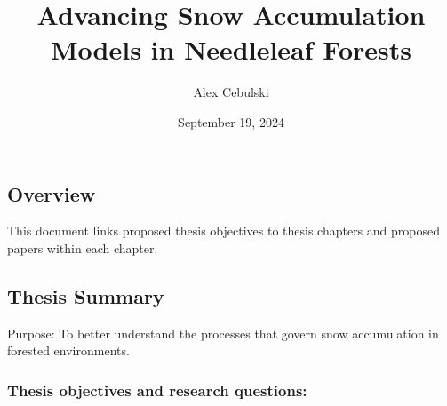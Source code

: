 \documentclass[
  letterpaper,
  DIV=11,
  numbers=noendperiod]{scrartcl}
\title{Advancing Snow Accumulation Models in Needleleaf Forests}
\author{Alex Cebulski}
\date{September 19, 2024}
\begin{document}
\maketitle

\subsection{Overview}\label{overview}

This document links proposed thesis objectives to thesis chapters and
proposed papers within each chapter.

\subsection{Thesis Summary}\label{thesis-summary}

Purpose: To better understand the processes that govern snow
accumulation in forested environments.

\subsubsection{Thesis objectives and research
questions:}\label{thesis-objectives-and-research-questions}
\end{document}

